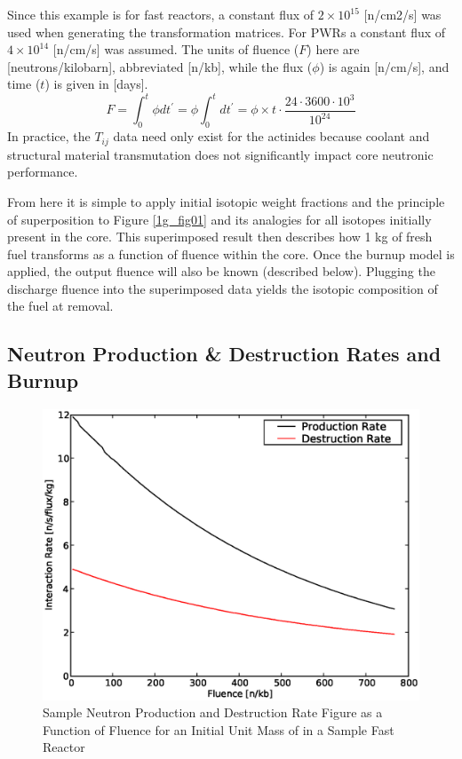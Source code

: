 Since this example is for fast reactors, a constant flux of $2\times10^{15}$ [n/cm2/s] was used 
when generating the transformation matrices.  For PWRs a constant flux of 
$4\times10^{14}$ [n/cm/s] 
was assumed.  The units of fluence ($F$) here are [neutrons/kilobarn], abbreviated [n/kb], while the 
flux ($\phi$) is again [n/cm/s], and time ($t$) is given in [days].
\begin{equation}
\label{fluence}
F = \int_0^t \phi dt^\prime = \phi \int_0^t dt^\prime = \phi \times t \cdot \frac{24 \cdot 3600 \cdot 10^3}{10^{24}}
\end{equation}
In practice, the $T_{ij}$ data need only exist for the actinides because coolant and structural 
material transmutation does not significantly impact core neutronic performance.

From here it is simple to apply initial isotopic weight fractions and the principle of superposition 
to Figure \ref{1g_fig01} and its analogies for all isotopes initially present in the core.  This superimposed result then describes 
how 1 kg of fresh fuel transforms as a function of fluence within the core. Once the burnup model is applied, 
the output fluence will also be known (described below).  Plugging the discharge fluence into the superimposed data 
yields the isotopic composition of the fuel at removal. 



\subsection{Neutron Production \& Destruction Rates and Burnup}
\label{1g_sec:pdbu}

\begin{figure}[htbp]
\caption{Sample Neutron Production and Destruction Rate Figure as a Function of Fluence for an Initial Unit Mass of  in a Sample Fast Reactor}
\label{1g_fig02}
\begin{center}
\includegraphics[scale=0.5]{one_group_method/figs/Fig02.eps}
\end{center}
\end{figure}

